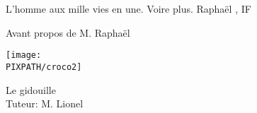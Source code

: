 \thispagestyle{empty}

\date{ gidouille }

{

\newcommand*\initfamily{}
\initfamily

}


{\Large L'homme aux mille vies en une. Voire plus.}
\vskip 5cm
{\Large Raphaël , IF}

{\large Avant propos de M. Raphaël }

\vfill
\begin{center}
    \texttt{[image: \\PIXPATH/croco2]}
\end{center}
\vfill
\hfill{\Large Le  gidouille }\\
{\large Tuteur: M. Lionel }


